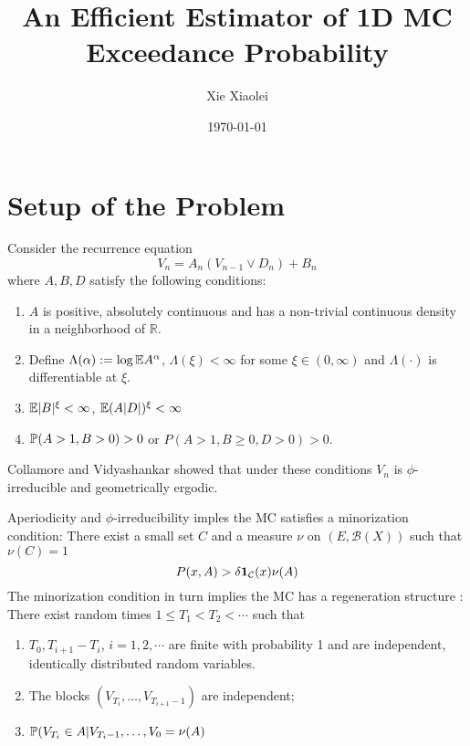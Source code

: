 \documentclass{beamer}
\title{An Efficient Estimator of 1D MC Exceedance Probability} %
\author{Xie Xiaolei} %
\institute[UCPH] %
{
Copenhagen University  \\ %
\medskip
\textit{hnq365@math.ku.dk} %
}
\date{\today} %
\begin{document}
\begin{frame}
\titlepage %
\end{frame}


\section{Setup of the Problem}
\begin{frame}
  Consider the recurrence equation 
  \[
  V_n = A_n (V_{n-1} \vee D_n) + B_n
  \]
  where $A, B, D$ satisfy the following conditions:
  \begin{enumerate}
  \item $A$ is positive, absolutely continuous and has a non-trivial continuous density in
    a neighborhood of $\mathbb R$.
  \item Define $\Lambda(\alpha) := \log \E A^\alpha$, $\Lambda(\xi) < \infty$ for some $\xi \in (0,
    \infty)$ and $\Lambda(\cdot)$ is differentiable at $\xi$.
  \item $\E |B|^\xi < \infty$, $\E (A|D|)^\xi < \infty$
  \item $\P(A > 1, B > 0) > 0$ or $P(A > 1, B \geq 0, D > 0) > 0$.
  \end{enumerate}
  Collamore and Vidyashankar showed \cite{Collamore20133378} that
  under these conditions $V_n$ is $\phi$-irreducible and geometrically
  ergodic.
\end{frame}

\begin{frame}
  Aperiodicity and $\phi$-irreducibility imples the MC satisfies a
  minorization condition: There exist a small set $C$ and a measure
  $\nu$ on $(E, \mathcal B(X))$ such that $\nu(C) = 1$
  \[
  P(x, A) > \delta \I{\mathcal C}(x) \nu(A)
  \]
  The minorization condition in turn implies the MC has a regeneration
  structure \cite{Nummelin1978}: There exist random times $1 \leq T_1
  < T_2 < \cdots$ such that
  \begin{enumerate}
  \item $T_0, T_{i+1} - T_{i}$, $i = 1, 2, \cdots$ are finite with
    probability 1 and are independent, identically distributed random
    variables.
  \item The blocks $(V_{T_i}, \dots, V_{T_{i+1} - 1})$ are independent;
  \item $\P(V_{T_i} \in A | V_{T_{i}-1}, \dots, V_0 = \nu(A)$
  \end{enumerate}
\end{frame}
\end{document}
